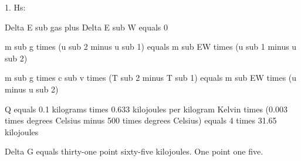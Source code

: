 1. Hs: 

Delta E sub gas plus Delta E sub W equals 0

m sub g times (u sub 2 minus u sub 1) equals m sub EW times (u sub 1 minus u sub 2)

m sub g times c sub v times (T sub 2 minus T sub 1) equals m sub EW times (u minus u sub 2)

Q equals 0.1 kilograms times 0.633 kilojoules per kilogram Kelvin times (0.003 times degrees Celsius minus 500 times degrees Celsius) equals 4 times 31.65 kilojoules

Delta G equals thirty-one point sixty-five kilojoules.  
One point one five.